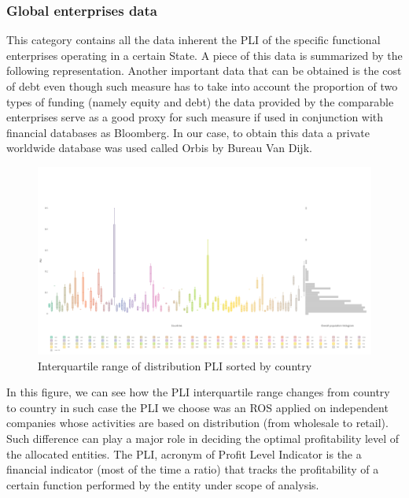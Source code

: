 \documentclass{article}
\begin{document}
\subsubsection{Global enterprises data}
This category contains all the data inherent the PLI of the specific functional enterprises operating in a certain State.
A piece of this data is summarized by the following representation. Another important data that can be obtained is the cost of debt \cite{berman_financial_2013} even though such measure has to take into account the proportion of two types of funding (namely equity and debt) the data provided by the comparable enterprises serve as a good proxy for such measure if used in conjunction with financial databases as Bloomberg. In our case, to obtain this data a private worldwide database was used called Orbis by Bureau Van Dijk.

\begin{figure}[H]
\centering
\includegraphics[width=\textwidth]{Images/plidist.png}
\caption{Interquartile range of distribution PLI sorted by country}
\end{figure}

In this figure, we can see how the PLI interquartile range changes from country to country in such case the PLI we choose was an ROS applied on independent companies whose activities are based on distribution (from wholesale to retail). Such difference can play a major role in deciding the optimal profitability level of the allocated entities. The PLI, acronym of Profit Level Indicator is the a financial indicator (most of the time a ratio) that tracks the profitability of a certain function performed by the entity under scope of analysis.
\end{document}
